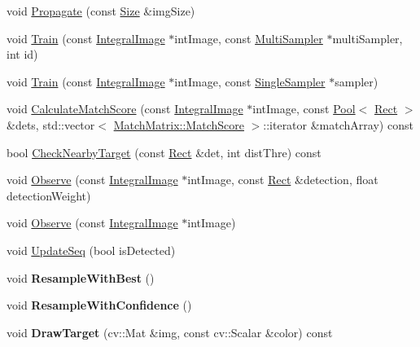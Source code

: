 \begin{DoxyCompactItemize}
\item 
void \hyperlink{classSingleTarget_a2036d90f89d1a65966523c559aee3d38}{Propagate} (const \hyperlink{classSize}{Size} \&img\+Size)
\item 
void \hyperlink{classSingleTarget_a13cab0742ea9f690c87fbb7cc1e7978e}{Train} (const \hyperlink{classIntegralImage}{Integral\+Image} $\ast$int\+Image, const \hyperlink{classMultiSampler}{Multi\+Sampler} $\ast$multi\+Sampler, int id)
\item 
void \hyperlink{classSingleTarget_ab22b42729018c6b9b37ee991a0f55778}{Train} (const \hyperlink{classIntegralImage}{Integral\+Image} $\ast$int\+Image, const \hyperlink{classSingleSampler}{Single\+Sampler} $\ast$sampler)
\item 
void \hyperlink{classSingleTarget_a9979d02b76cebbf00240484d88d71029}{Calculate\+Match\+Score} (const \hyperlink{classIntegralImage}{Integral\+Image} $\ast$int\+Image, const \hyperlink{classPool}{Pool}$<$ \hyperlink{classRect}{Rect} $>$ \&dets, std\+::vector$<$ \hyperlink{structMatchMatrix_1_1MatchScore}{Match\+Matrix\+::\+Match\+Score} $>$\+::iterator \&match\+Array) const 
\item 
bool \hyperlink{classSingleTarget_af144eab566d3d52391ba1b432b767faa}{Check\+Nearby\+Target} (const \hyperlink{classRect}{Rect} \&det, int dist\+Thre) const 
\item 
void \hyperlink{classSingleTarget_a9ce84c111efa084c8bf9aa89736dffc8}{Observe} (const \hyperlink{classIntegralImage}{Integral\+Image} $\ast$int\+Image, const \hyperlink{classRect}{Rect} \&detection, float detection\+Weight)
\item 
void \hyperlink{classSingleTarget_a1e22348deeeae3e5d8d1c964df9c8fc8}{Observe} (const \hyperlink{classIntegralImage}{Integral\+Image} $\ast$int\+Image)
\item 
void \hyperlink{classSingleTarget_aa620ca1f64fe972c8dc110e0a6012213}{Update\+Seq} (bool is\+Detected)
\item 
\hypertarget{classSingleTarget_a4b77b8dbe78d051ab5f190eef5b9a51a}{}void {\bfseries Resample\+With\+Best} ()\label{classSingleTarget_a4b77b8dbe78d051ab5f190eef5b9a51a}

\item 
\hypertarget{classSingleTarget_a8ba04565921bcbcce7a04c1c76daa4ca}{}void {\bfseries Resample\+With\+Confidence} ()\label{classSingleTarget_a8ba04565921bcbcce7a04c1c76daa4ca}

\item 
\hypertarget{classSingleTarget_affde5a4d83abae23455e12eabd64d457}{}void {\bfseries Draw\+Target} (cv\+::\+Mat \&img, const cv\+::\+Scalar \&color) const \label{classSingleTarget_affde5a4d83abae23455e12eabd64d457}


\end{DoxyCompactItemize}

